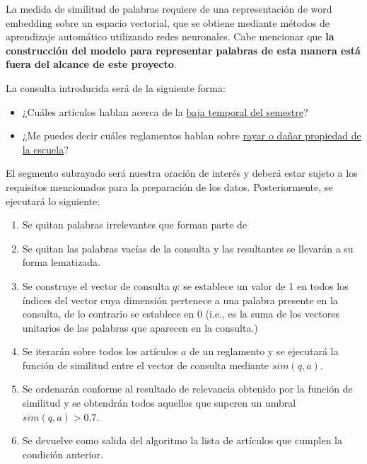 La medida de similitud de palabras requiere de una representación de word embedding sobre un espacio vectorial, que se obtiene mediante métodos de aprendizaje automático utilizando redes neuronales. Cabe mencionar que \textbf{la construcción del modelo para representar palabras de esta manera está fuera del alcance de este proyecto}.

La consulta introducida será de la siguiente forma:

\begin{itemize}
    \item ¿Cuáles artículos hablan acerca de la \underline{baja temporal del semestre}?
    \item ¿Me puedes decir cuáles reglamentos hablan sobre \underline{rayar o dañar propiedad de la escuela}?
\end{itemize}

El segmento subrayado será nuestra oración de interés y deberá estar sujeto a los requisitos mencionados para la preparación de los datos. Posteriormente, se ejecutará lo siguiente:

\begin{enumerate}
    \item Se quitan palabras irrelevantes que forman parte de
    \item Se quitan las palabras vacías de la consulta y las resultantes se llevarán a su forma lematizada.
    \item Se construye el vector de consulta $q$: se establece un valor de 1 en todos los índices del vector cuya dimensión pertenece a una palabra presente en la consulta, de lo contrario se establece en 0 (i.e., es la suma de los vectores unitarios de las palabras que aparecen en la consulta.)
    \item Se iterarán sobre todos los artículos $a$ de un reglamento y se ejecutará la función de similitud entre el vector de consulta mediante $sim(q, a)$.
    \item Se ordenarán conforme al resultado de relevancia obtenido por la función de similitud y se obtendrán todos aquellos que superen un umbral $sim(q, a)  > 0.7$.
    \item Se devuelve como salida del algoritmo la lista de artículos que cumplen la condición anterior.
\end{enumerate}

